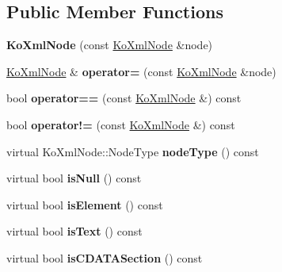 \subsection*{Public Member Functions}
\begin{CompactItemize}
\item 
\hypertarget{classKoXmlNode_b88c9ac0386a4c92ede215f97afc87e3}{
\textbf{KoXmlNode} (const \hyperlink{classKoXmlNode}{KoXmlNode} \&node)}
\label{classKoXmlNode_b88c9ac0386a4c92ede215f97afc87e3}

\item 
\hypertarget{classKoXmlNode_06a42651d8b1d8d46ccfd963789d28a3}{
\hyperlink{classKoXmlNode}{KoXmlNode} \& \textbf{operator=} (const \hyperlink{classKoXmlNode}{KoXmlNode} \&node)}
\label{classKoXmlNode_06a42651d8b1d8d46ccfd963789d28a3}

\item 
\hypertarget{classKoXmlNode_0c491bd3aa1f60c7c2f8aa66fcaf7ad4}{
bool \textbf{operator==} (const \hyperlink{classKoXmlNode}{KoXmlNode} \&) const }
\label{classKoXmlNode_0c491bd3aa1f60c7c2f8aa66fcaf7ad4}

\item 
\hypertarget{classKoXmlNode_a7320ffe46fab32645e9f912793318df}{
bool \textbf{operator!=} (const \hyperlink{classKoXmlNode}{KoXmlNode} \&) const }
\label{classKoXmlNode_a7320ffe46fab32645e9f912793318df}

\item 
\hypertarget{classKoXmlNode_8fdc94c286b2ee40ed1d3e418739245a}{
virtual KoXmlNode::NodeType \textbf{nodeType} () const }
\label{classKoXmlNode_8fdc94c286b2ee40ed1d3e418739245a}

\item 
\hypertarget{classKoXmlNode_93fadc49d9739def1d0377760b804294}{
virtual bool \textbf{isNull} () const }
\label{classKoXmlNode_93fadc49d9739def1d0377760b804294}

\item 
\hypertarget{classKoXmlNode_27d714ac8a277c16d90cbeaf87e23105}{
virtual bool \textbf{isElement} () const }
\label{classKoXmlNode_27d714ac8a277c16d90cbeaf87e23105}

\item 
\hypertarget{classKoXmlNode_1018dd29ae7b00e453bd577764b71ecd}{
virtual bool \textbf{isText} () const }
\label{classKoXmlNode_1018dd29ae7b00e453bd577764b71ecd}

\item 
\hypertarget{classKoXmlNode_e84ca4ef65b1d85ed8b90a07fb324fc8}{
virtual bool \textbf{isCDATASection} () const }
\label{classKoXmlNode_e84ca4ef65b1d85ed8b90a07fb324fc8}


\end{CompactItemize}
